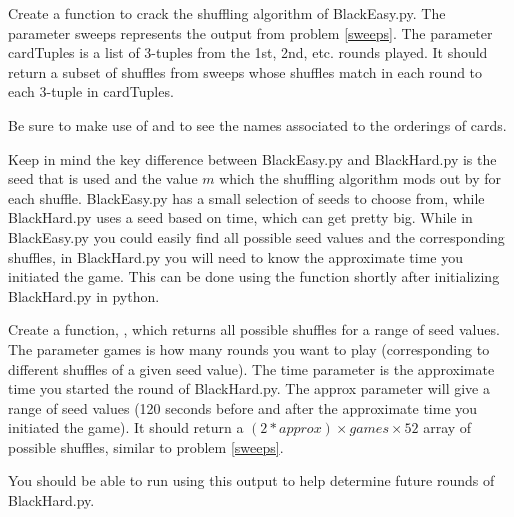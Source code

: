 \begin{problem}

Create a function  to crack the shuffling algorithm of BlackEasy.py.
The parameter sweeps represents the output from problem \ref{sweeps}.
The parameter cardTuples is a list of 3-tuples from the 1st, 2nd, etc. rounds played.
It should return a subset of shuffles from sweeps whose shuffles match in each round to each 3-tuple in cardTuples.

Be sure to make use of  and  to see the names associated to the orderings of cards.

\end{problem}

Keep in mind the key difference between BlackEasy.py and BlackHard.py is the seed that is used and the value $m$ which the shuffling algorithm mods out by for each shuffle.
BlackEasy.py has a small selection of seeds to choose from, while BlackHard.py uses a seed based on time, which can get pretty big.
While in BlackEasy.py you could easily find all possible seed values and the corresponding shuffles, in BlackHard.py you will need to know the approximate time you initiated the game.
This can be done using the  function shortly after initializing BlackHard.py in python.

\begin{problem}

Create a function, , which returns all possible shuffles for a range of seed values.
The parameter games is how many rounds you want to play (corresponding to different shuffles of a given seed value).
The time parameter is the approximate time you started the round of BlackHard.py.
The approx parameter will give a range of seed values (120 seconds before and after the approximate time you initiated the game).
It should return a $(2*approx) \times games \times 52$ array of possible shuffles, similar to problem \ref{sweeps}.

You should be able to run  using this output to help determine future rounds of BlackHard.py.

\end{problem}
